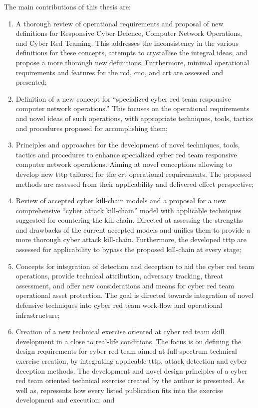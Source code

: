 The main contributions of this thesis are:
\begin{enumerate}
    \item A thorough review of operational requirements and proposal of new definitions for Responsive Cyber Defence, Computer Network Operations, and Cyber Red Teaming. This addresses the inconsistency in the various definitions for these concepts, attempts to crystallise the integral ideas, and propose a more thorough new definitions. Furthermore, minimal operational requirements and features for the \gls{rcd}, \gls{cno}, and \gls{crt} are assessed and presented;
    \item Definition of a new concept for ``specialized cyber red team responsive computer network operations.'' This focuses on the operational requirements and novel ideas of such operations, with appropriate techniques, tools, tactics and procedures proposed for accomplishing them;
    \item Principles and approaches for the development of novel techniques, tools, tactics and procedures to enhance specialized cyber red team responsive computer network operations. Aiming at novel conceptions allowing to develop new \gls{tttp} tailored for the \gls{crt} operational requirements. The proposed methods are assessed from their applicability and delivered effect perspective;
    \item Review of accepted cyber kill-chain models and a proposal for a new comprehensive ``cyber attack kill-chain'' model with applicable techniques suggested for countering the kill-chain. Directed at assessing the strengths and drawbacks of the current accepted models and unifies them to provide a more thorough cyber attack kill-chain. Furthermore, the developed \gls{tttp} are assessed for applicability to bypass the proposed kill-chain at every stage;
    \item Concepts for integration of detection and deception to aid the cyber red team operations, provide technical attribution, adversary tracking, threat assessment, and offer new considerations and means for cyber red team operational asset protection. The goal is directed towards integration of novel defensive techniques into cyber red team work-flow and operational infrastructure;
    \item Creation of a new technical exercise oriented at cyber red team skill development in a close to real-life conditions. The focus is on defining the design requirements for cyber red team aimed at full-spectrum technical exercise creation, by integrating applicable \gls{tttp}, attack detection and cyber deception methods. The development and novel design principles of a cyber red team oriented technical exercise created by the author is presented. As well as, represents how every listed publication fits into the exercise development and execution; and

\end{enumerate}
